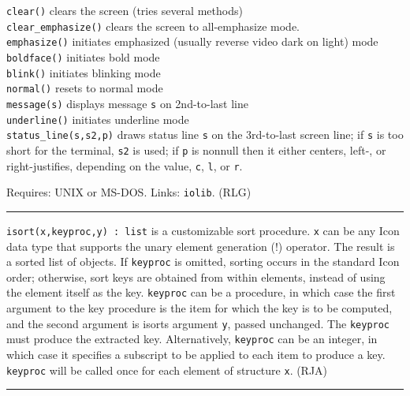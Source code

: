 \texttt{clear()} clears the screen (tries several methods)\\
\texttt{clear\_emphasize()} clears the screen to all-emphasize
mode.\\
\texttt{emphasize()} initiates emphasized (usually reverse video dark on
light) mode\\
\texttt{boldface()} initiates bold mode\\
\texttt{blink()} initiates blinking mode\\
\texttt{normal()} resets to normal mode\\
\texttt{message(s)} displays message \texttt{s} on 2nd-to-last
line\\
\texttt{underline()} initiates underline mode\\
\texttt{status\_line(s,s2,p)} draws status line \texttt{s} on the
3rd-to-last screen line; if \texttt{s} is too short for the terminal,
\texttt{s2} is used; if \texttt{p} is nonnull then it either centers,
left-, or right-justifies, depending on the value,
\texttt{{\textquotedbl}c{\textquotedbl}},
\texttt{{\textquotedbl}l{\textquotedbl}}, or
\texttt{{\textquotedbl}r{\textquotedbl}}.

Requires: UNIX or MS-DOS. Links: \texttt{iolib}. (RLG)

\vspace{0.25cm}\hrule{}

\texttt{i}\texttt{sort}\texttt{(x,keyproc,y) : list} is a
customizable sort procedure. \texttt{x} can be any Icon data type that
supports the unary element generation (!) operator. The result is a
sorted list of objects. If \texttt{keyproc} is omitted, sorting occurs
in the standard Icon order; otherwise, sort keys are obtained from
within elements, instead of using the element itself as the key.
\texttt{keyproc} can be a procedure, in which case the first argument
to the key procedure is the item for which the key is to be computed,
and the second argument is isort{\textquotesingle}s argument
\texttt{y}, passed unchanged. The \texttt{keyproc} must produce the
extracted key. Alternatively, \texttt{keyproc} can be an integer, in
which case it specifies a subscript to be applied to each item to
produce a key. \texttt{keyproc} will be called once for each element of
structure \texttt{x}. (RJA)

\vspace{0.25cm}\hrule{}

